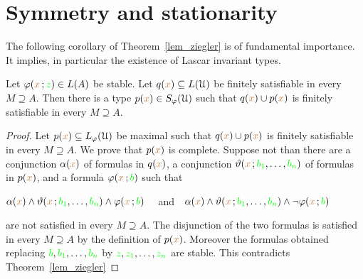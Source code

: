 



\section{Symmetry and stationarity}\label{stationarity}

\def\ceq#1#2#3{\parbox[t]{20ex}{$\displaystyle #1$}\medrel{#2}$\displaystyle  #3$}

The following corollary of Theorem~\ref{lem_ziegler} is of fundamental importance.
It implies, in particular the existence of Lascar invariant types.

\begin{corollary}\label{corol_stable_coheir_over_models}
  Let $\varphi({\color{brown} x}\,;{\color{green} z})\in L(A)$ be stable.
  Let $q({\color{brown} x})\subseteq L(\EuScript U)$ be finitely satisfiable in every $M\supseteq A$.
  Then there is a type $p({\color{brown} x})\in S_\varphi(\EuScript U)$ such that $q({\color{brown} x})\cup p({\color{brown} x})$ is finitely satisfiable in every $M\supseteq A$.
\end{corollary}

\begin{proof}
  Let $p({\color{brown} x})\subseteq L_\varphi(\EuScript U)$ be maximal such that $q({\color{brown} x})\cup p({\color{brown} x})$ is finitely satisfiable in every $M\supseteq A$.
  We prove that $p({\color{brown} x})$ is complete.
  Suppose not than there are a conjunction $\alpha({\color{brown} x})$ of formulas in $q({\color{brown} x})$, a conjunction $\vartheta({\color{brown} x}\,;{\color{green} b_1},\dots,{\color{green} b_n})$ of formulas in $p({\color{brown} x})$, and a formula $\varphi({\color{brown} x}\,;{\color{green} b})$ such that 

  \hfil$\alpha({\color{brown} x})\wedge\vartheta({\color{brown} x}\,;{\color{green} b_1},\dots,{\color{green} b_n})\wedge\varphi({\color{brown} x}\,;{\color{green} b})$ \ \ and\ \   $\alpha({\color{brown} x})\wedge\vartheta({\color{brown} x}\,;{\color{green} b_1},\dots,{\color{green} b_n})\wedge\neg\varphi({\color{brown} x}\,;{\color{green} b})$ 
 
  are not satisfied in every $M\supseteq A$.
  The disjunction of the two formulas is satisfied in every $M\supseteq A$ by the definition of $p({\color{brown} x})$.
  Moreover the formulas obtained replacing ${\color{green} b},{\color{green} b_1},\dots,{\color{green} b_n}$ by ${\color{green} z},{\color{green} z_1},\dots,{\color{green} z_n}$ are stable.
  This contradicts Theorem~\ref{lem_ziegler}
\end{proof}

